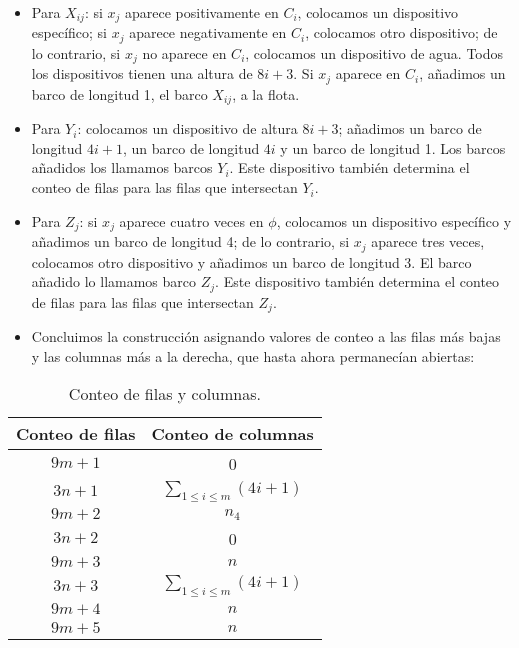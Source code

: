 \documentclass{article}
\begin{document}
\begin{itemize}
    \item Para $X_{ij}$: si $x_j$ aparece positivamente en $C_i$, colocamos un dispositivo específico; si $x_j$ aparece negativamente en $C_i$, colocamos otro dispositivo; de lo contrario, si $x_j$ no aparece en $C_i$, colocamos un dispositivo de agua. Todos los dispositivos tienen una altura de $8i + 3$. Si $x_j$ aparece en $C_i$, añadimos un barco de longitud 1, el barco $X_{ij}$, a la flota.
    \item Para $Y_i$: colocamos un dispositivo de altura $8i + 3$; añadimos un barco de longitud $4i + 1$, un barco de longitud $4i$ y un barco de longitud 1. Los barcos añadidos los llamamos barcos $Y_i$. Este dispositivo también determina el conteo de filas para las filas que intersectan $Y_i$.
    \item Para $Z_j$: si $x_j$ aparece cuatro veces en $\phi$, colocamos un dispositivo específico y añadimos un barco de longitud 4; de lo contrario, si $x_j$ aparece tres veces, colocamos otro dispositivo y añadimos un barco de longitud 3. El barco añadido lo llamamos barco $Z_j$. Este dispositivo también determina el conteo de filas para las filas que intersectan $Z_j$.
    \item Concluimos la construcción asignando valores de conteo a las filas más bajas y las columnas más a la derecha, que hasta ahora permanecían abiertas:
\end{itemize}

\begin{table}[h!]
    \centering
    \begin{tabular}{|c|c|}
        \hline
        \textbf{Conteo de filas} & \textbf{Conteo de columnas} \\
        \hline
        $9m + 1$ & 0 \\
        $3n + 1$ & $\sum_{1 \leq i \leq m} (4i + 1)$ \\
        $9m + 2$ & $n_4$ \\
        $3n + 2$ & 0 \\
        $9m + 3$ & $n$ \\
        $3n + 3$ & $\sum_{1 \leq i \leq m} (4i + 1)$ \\
        $9m + 4$ & $n$ \\
        $9m + 5$ & $n$ \\
        \hline
    \end{tabular}
    \caption{Conteo de filas y columnas.}
\end{table}
\end{document}

